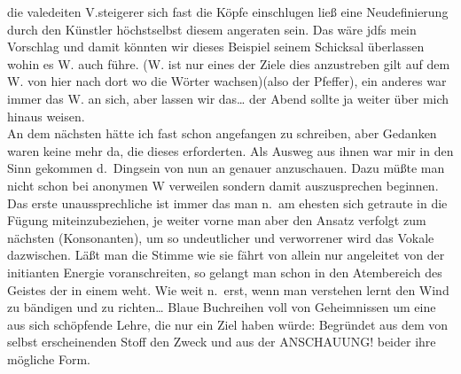 \documentclass[
]{article}
\begin{document}
die valedeiten V.steigerer sich fast die Köpfe einschlugen ließ eine
Neudefinierung durch den Künstler höchstselbst diesem angeraten sein.
Das wäre jdfs mein Vorschlag und damit könnten wir dieses Beispiel
seinem Schicksal überlassen wohin es W. auch führe. (W. ist nur eines
der Ziele dies anzustreben gilt auf dem W. von hier nach dort wo die
Wörter wachsen)(also der Pfeffer), ein anderes war immer das W. an sich,
aber lassen wir das\ldots{} der Abend sollte ja weiter über mich hinaus
weisen.\\
An dem nächsten hätte ich fast schon angefangen zu schreiben, aber
Gedanken waren keine mehr da, die dieses erforderten. Als Ausweg aus
ihnen war mir in den Sinn gekommen d.~Dingsein von nun an genauer
anzuschauen. Dazu müßte man nicht schon bei anonymen W verweilen sondern
damit auszusprechen beginnen. Das erste unaussprechliche ist immer das
man n.~am ehesten sich getraute in die Fügung miteinzubeziehen, je
weiter vorne man aber den Ansatz verfolgt zum nächsten (Konsonanten), um
so undeutlicher und verworrener wird das Vokale dazwischen. Läßt man die
Stimme wie sie fährt von allein nur angeleitet von der initianten
Energie voranschreiten, so gelangt man schon in den Atembereich des
Geistes der in einem weht. Wie weit n.~erst, wenn man verstehen lernt
den Wind zu bändigen und zu richten\ldots{} Blaue Buchreihen voll von
Geheimnissen um eine aus sich schöpfende Lehre, die nur ein Ziel haben
würde: Begründet aus dem von selbst erscheinenden Stoff den Zweck und
aus der ANSCHAUUNG! beider ihre mögliche Form.
\end{document}
